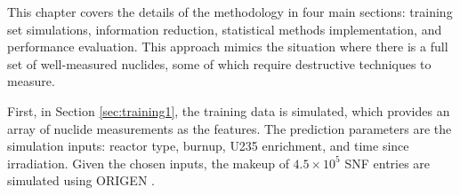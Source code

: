 %

This chapter covers the details of the methodology in four main sections:
training set simulations, information reduction, statistical methods
implementation, and performance evaluation. This approach mimics the situation
where there is a full set of well-measured nuclides, some of which require
destructive techniques to measure. 

First, in Section \ref{sec:training1}, the training data is simulated, which
provides an array of nuclide measurements as the features. The prediction
parameters are the simulation inputs: reactor type, burnup, \gls{U235}
enrichment, and time since irradiation.  Given the chosen inputs, the makeup of
$4.5 \times 10^5$ \gls{SNF} entries are simulated using \gls{ORIGEN}
\cite{scale, origen, origenarp}.

